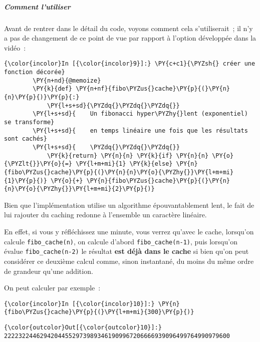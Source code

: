     \hypertarget{comment-lutiliser}{%
\subparagraph{Comment l'utiliser}\label{comment-lutiliser}}

    Avant de rentrer dans le détail du code, voyons comment cela
s'utiliserait~; il n'y a pas de changement de ce point de vue par
rapport à l'option développée dans la vidéo~:

    \begin{Verbatim}[commandchars=\\\{\},frame=single,framerule=0.3mm,rulecolor=\color{cellframecolor}]
{\color{incolor}In [{\color{incolor}9}]:} \PY{c+c1}{\PYZsh{} créer une fonction décorée}
        \PY{n+nd}{@memoize}
        \PY{k}{def} \PY{n+nf}{fibo\PYZus{}cache}\PY{p}{(}\PY{n}{n}\PY{p}{)}\PY{p}{:}
            \PY{l+s+sd}{\PYZdq{}\PYZdq{}\PYZdq{}}
        \PY{l+s+sd}{    Un fibonacci hyper\PYZhy{}lent (exponentiel) se transforme}
        \PY{l+s+sd}{    en temps linéaire une fois que les résultats sont cachés}
        \PY{l+s+sd}{    \PYZdq{}\PYZdq{}\PYZdq{}}
            \PY{k}{return} \PY{n}{n} \PY{k}{if} \PY{n}{n} \PY{o}{\PYZlt{}}\PY{o}{=} \PY{l+m+mi}{1} \PY{k}{else} \PY{n}{fibo\PYZus{}cache}\PY{p}{(}\PY{n}{n}\PY{o}{\PYZhy{}}\PY{l+m+mi}{1}\PY{p}{)} \PY{o}{+} \PY{n}{fibo\PYZus{}cache}\PY{p}{(}\PY{n}{n}\PY{o}{\PYZhy{}}\PY{l+m+mi}{2}\PY{p}{)}
\end{Verbatim}


    Bien que l'implémentation utilise un algorithme épouvantablement lent,
le fait de lui rajouter du caching redonne à l'ensemble un caractère
linéaire.

En effet, si vous y réfléchissez une minute, vous verrez qu'avec le
cache, lorsqu'on calcule \texttt{fibo\_cache(n)}, on calcule d'abord
\texttt{fibo\_cache(n-1)}, puis lorsqu'on évalue
\texttt{fibo\_cache(n-2)} le résultat \textbf{est déjà dans le cache} si
bien qu'on peut considérer ce deuxième calcul comme, sinon instantané,
du moins du même ordre de grandeur qu'une addition.

On peut calculer par exemple~:

    \begin{Verbatim}[commandchars=\\\{\},frame=single,framerule=0.3mm,rulecolor=\color{cellframecolor}]
{\color{incolor}In [{\color{incolor}10}]:} \PY{n}{fibo\PYZus{}cache}\PY{p}{(}\PY{l+m+mi}{300}\PY{p}{)}
\end{Verbatim}


\begin{Verbatim}[commandchars=\\\{\},frame=single,framerule=0.3mm,rulecolor=\color{cellframecolor}]
{\color{outcolor}Out[{\color{outcolor}10}]:} 222232244629420445529739893461909967206666939096499764990979600
\end{Verbatim}
            
